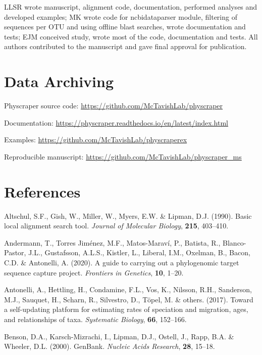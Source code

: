 \documentclass[]{article}
\begin{document}
LLSR wrote manuscript, alignment code, documentation, performed analyses and developed examples; MK wrote code for ncbidataparser module, filtering of sequences per OTU and using offline blast searches, wrote documentation and tests; EJM conceived study, wrote most of the code, documentation and tests.
All authors contributed to the manuscript and gave final approval for publication.

\hypertarget{data-archiving}{%
\section{Data Archiving}\label{data-archiving}}

Physcraper source code: \url{https://github.com/McTavishLab/physcraper}

Documentation: \url{https://physcraper.readthedocs.io/en/latest/index.html}

Examples: \url{https://github.com/McTavishLab/physcraperex}

Reproducible manuscript: \url{https://github.com/McTavishLab/physcraper_ms}

\hypertarget{references}{%
\section*{References}\label{references}}

\hypertarget{refs}{}
\leavevmode\hypertarget{ref-altschul1990basic}{}%
Altschul, S.F., Gish, W., Miller, W., Myers, E.W. \& Lipman, D.J. (1990). Basic local alignment search tool. \emph{Journal of Molecular Biology}, \textbf{215}, 403--410.

\leavevmode\hypertarget{ref-andermann2020guide}{}%
Andermann, T., Torres Jiménez, M.F., Matos-Maraví, P., Batista, R., Blanco-Pastor, J.L., Gustafsson, A.L.S., Kistler, L., Liberal, I.M., Oxelman, B., Bacon, C.D. \& Antonelli, A. (2020). A guide to carrying out a phylogenomic target sequence capture project. \emph{Frontiers in Genetics}, \textbf{10}, 1--20.

\leavevmode\hypertarget{ref-antonelli2017toward}{}%
Antonelli, A., Hettling, H., Condamine, F.L., Vos, K., Nilsson, R.H., Sanderson, M.J., Sauquet, H., Scharn, R., Silvestro, D., Töpel, M. \& others. (2017). Toward a self-updating platform for estimating rates of speciation and migration, ages, and relationships of taxa. \emph{Systematic Biology}, \textbf{66}, 152--166.

\leavevmode\hypertarget{ref-benson2000genbank}{}%
Benson, D.A., Karsch-Mizrachi, I., Lipman, D.J., Ostell, J., Rapp, B.A. \& Wheeler, D.L. (2000). GenBank. \emph{Nucleic Acids Research}, \textbf{28}, 15--18.
\end{document}
